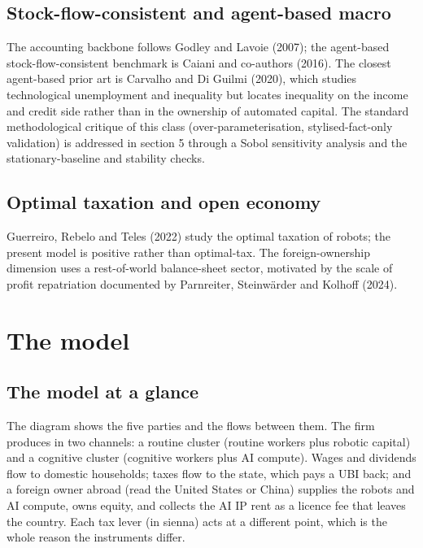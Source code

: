 \documentclass[12pt]{article}
\begin{document}
\hypertarget{stock-flow-consistent-and-agent-based-macro}{%
\subsection{Stock-flow-consistent and agent-based
macro}\label{stock-flow-consistent-and-agent-based-macro}}

The accounting backbone follows Godley and Lavoie (2007); the
agent-based stock-flow-consistent benchmark is Caiani and co-authors
(2016). The closest agent-based prior art is Carvalho and Di Guilmi
(2020), which studies technological unemployment and inequality but
locates inequality on the income and credit side rather than in the
ownership of automated capital. The standard methodological critique of
this class (over-parameterisation, stylised-fact-only validation) is
addressed in section 5 through a Sobol sensitivity analysis and the
stationary-baseline and stability checks.

\hypertarget{optimal-taxation-and-open-economy}{%
\subsection{Optimal taxation and open
economy}\label{optimal-taxation-and-open-economy}}

Guerreiro, Rebelo and Teles (2022) study the optimal taxation of robots;
the present model is positive rather than optimal-tax. The
foreign-ownership dimension uses a rest-of-world balance-sheet sector,
motivated by the scale of profit repatriation documented by Parnreiter,
Steinwärder and Kolhoff (2024).

\hypertarget{model}{}
\hypertarget{the-model}{%
\section{The model}\label{the-model}}

\hypertarget{the-model-at-a-glance}{%
\subsection{The model at a glance}\label{the-model-at-a-glance}}

The diagram shows the five parties and the flows between them. The firm
produces in two channels: a routine cluster (routine workers plus
robotic capital) and a cognitive cluster (cognitive workers plus AI
compute). Wages and dividends flow to domestic households; taxes flow to
the state, which pays a UBI back; and a foreign owner abroad (read the
United States or China) supplies the robots and AI compute, owns equity,
and collects the AI IP rent as a licence fee that leaves the country.
Each tax lever (in sienna) acts at a different point, which is the whole
reason the instruments differ.
\end{document}

